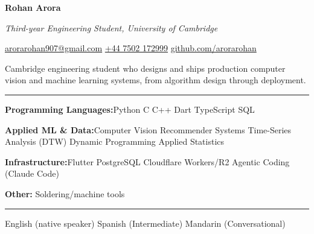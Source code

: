 \documentclass[11pt]{article}
\newcommand{\cvsection}[1]{%
  \vspace{10pt}%
  \noindent{\large\bfseries\MakeUppercase{#1}}\par
  \vspace{-4pt}\noindent\rule{\linewidth}{0.7pt}\vspace{4pt}%
}
\newcommand{\sep}{\quad\textbar\quad}
\begin{document}
\begin{center}
  {\Huge\bfseries Rohan Arora}\par
  \vspace{4pt}
  {\Large\itshape Third-year Engineering Student, University of Cambridge}\par
  \vspace{6pt}
  \href{mailto:arorarohan907@gmail.com}{arorarohan907@gmail.com}
  \sep
  \href{tel:+447502172999}{+44 7502 172999}
\sep \href{https://github.com/arorarohan}{github.com/arorarohan}
\end{center}

\vspace{6pt}

Cambridge engineering student who designs and ships production computer vision and machine learning systems, from algorithm design through deployment.

\cvsection{Skills}
\textbf{Programming Languages:}\quad\quad Python \sep C \sep C++ \sep Dart \sep TypeScript \sep SQL

\textbf{Applied ML \& Data:}\quad\quad Computer Vision \sep Recommender Systems \sep Time-Series Analysis (DTW) \sep Dynamic Programming \sep Applied Statistics 

\textbf{Infrastructure:}\quad\quad Flutter \sep PostgreSQL \sep Cloudflare Workers\slash R2 \sep Agentic Coding (Claude Code) 

\textbf{Other:} Soldering\slash machine tools

\cvsection{Languages}
English (native speaker) \sep Spanish (Intermediate) \sep Mandarin (Conversational)
\end{document}
